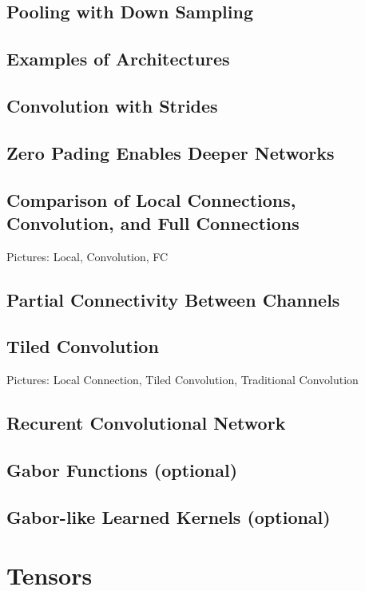 \documentclass[]{article}
\begin{document}
\subsection{Pooling with Down Sampling}

\subsection{Examples of Architectures}

\subsection{Convolution with Strides}

\subsection{Zero Pading Enables Deeper Networks}

\subsection{Comparison of Local Connections, Convolution, and Full Connections}
Pictures: Local, Convolution, FC

\subsection{Partial Connectivity Between Channels}

\subsection{Tiled Convolution}
Pictures: Local Connection, Tiled Convolution, Traditional Convolution

\subsection{Recurent Convolutional Network}

\subsection{Gabor Functions (optional)}

\subsection{Gabor-like Learned Kernels (optional)}

\section{Tensors}
\end{document}
